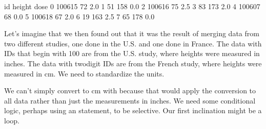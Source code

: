 \documentclass[letterpaper,10pt,english]{sphinxmanual}
\begin{document}
\begin{sphinxVerbatim}[commandchars=\\\{\}]
   
      \PYG{p}{[}         \PYG{p}{]}
      \PYG{p}{[}         \PYG{p}{]}
      \PYG{p}{[}         \PYG{p}{]}
 
\end{sphinxVerbatim}

\begin{sphinxVerbatim}[commandchars=\\\{\}]
       id  height  dose
0  100615      72   2.0
1      51     158   0.0
2  100616      75   2.5
3      83     173   2.0
4  100607      68   0.0
5  100618      67   2.0
6      19     163   2.5
7      65     178   0.0
\end{sphinxVerbatim}

Let’s imagine that we then found out that it was the result of merging data from two different studies, one done in the U.S. and one done in France.  The data with IDs that begin with 100 are from the U.S. study, where heights were measured in inches.  The data with two\sphinxhyphen{}digit IDs are from the French study, where heights were measured in cm.  We need to standardize the units.

We can’t simply convert to cm with  because that would apply the conversion to all data rather than just the measurements in inches.  We need some conditional logic, perhaps using an  statement, to be selective.  Our first inclination might be a loop.
\end{document}

